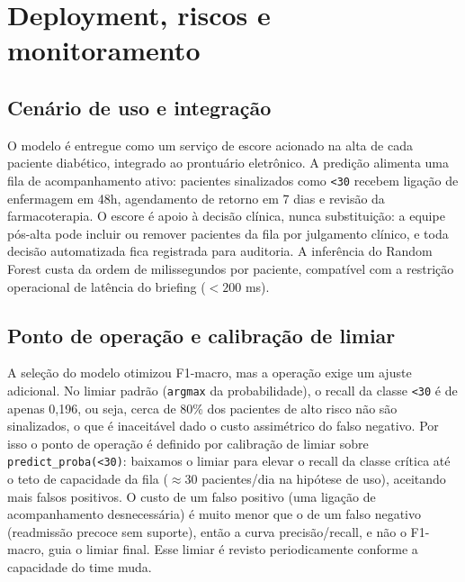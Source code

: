 \documentclass[12pt,a4paper]{article}
\begin{document}
\section{Deployment, riscos e monitoramento}

\subsection{Cenário de uso e integração}
O modelo é entregue como um serviço de escore acionado na alta de cada paciente diabético, integrado ao prontuário eletrônico. A predição alimenta uma fila de acompanhamento ativo: pacientes sinalizados como \texttt{<30} recebem ligação de enfermagem em 48h, agendamento de retorno em 7 dias e revisão da farmacoterapia. O escore é apoio à decisão clínica, nunca substituição: a equipe pós-alta pode incluir ou remover pacientes da fila por julgamento clínico, e toda decisão automatizada fica registrada para auditoria. A inferência do Random Forest custa da ordem de milissegundos por paciente, compatível com a restrição operacional de latência do briefing ($<200$ ms).

\subsection{Ponto de operação e calibração de limiar}
A seleção do modelo otimizou F1-macro, mas a operação exige um ajuste adicional. No limiar padrão (\texttt{argmax} da probabilidade), o recall da classe \texttt{<30} é de apenas 0{,}196, ou seja, cerca de 80\% dos pacientes de alto risco não são sinalizados, o que é inaceitável dado o custo assimétrico do falso negativo. Por isso o ponto de operação é definido por calibração de limiar sobre \texttt{predict\_proba(<30)}: baixamos o limiar para elevar o recall da classe crítica até o teto de capacidade da fila ($\approx$30 pacientes/dia na hipótese de uso), aceitando mais falsos positivos. O custo de um falso positivo (uma ligação de acompanhamento desnecessária) é muito menor que o de um falso negativo (readmissão precoce sem suporte), então a curva precisão/recall, e não o F1-macro, guia o limiar final. Esse limiar é revisto periodicamente conforme a capacidade do time muda.
\end{document}
